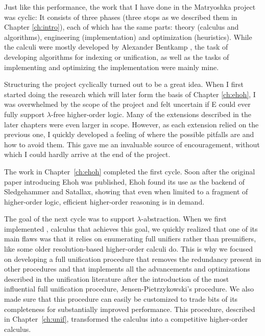 Just like this performance, the work that I have done in the Matryoshka project
was cyclic: It consists of three phases (three stops as we described them in
Chapter \ref{ch:intro}), each of which has the same parts: theory (calculus and
algorithms), engineering (implementation) and optimization (heuristics). While
the calculi were mostly developed by Alexander Bentkamp
\cite{bbcw-21-lfho,bbtvw-21-sup-lam,bbtv-21-full-ho-sup}, the task of developing
algorithms for indexing or unification, as well as the tasks of implementing and
optimizing the implementation were mainly mine.

Structuring the project cyclically turned out to be a great idea. When I first
started doing the research which will later form the basis of Chapter
\ref{ch:ehoh}, I was overwhelmed by the scope of the project and felt uncertain
if E could ever fully support $\lambda$-free higher-order logic. Many of the
extensions described in the  later chapters were even larger in scope. However,
as each extension relied on the previous one, I quickly developed a feeling of
where the possible pitfalls are and how to avoid them. This gave me an invaluable
source of encouragement, without which I could hardly arrive at the end of the
project.

The work in Chapter~\ref{ch:ehoh} completed the first cycle. Soon after the
original paper introducing Ehoh \cite{vbss-19-ehoh1} was published, Ehoh found
its use as the backend of Sledgehammer and Satallax, showing that even when limited
to a fragment of higher-order logic, efficient higher-order reasoning is in
demand.

The goal of the next cycle was to support $\lambda$-abstraction. When we first
implemented \lsup{}, calculus that achieves this goal, we quickly realized that
one of its main flaws was that it relies on enumerating full unifiers rather
than preunifiers, like some older resolution-based higher-order calculi do. This
is why we focused on developing a full unification procedure that removes the
redundancy present in other procedures and that implements all the advancements
and optimizations described in the unification literature after the introduction
of the most influential full unification procedure, Jensen-Pietrzykowski's
procedure. We also made sure that this procedure can easily be customized to
trade bits of its completeness for substantially improved performance. This
procedure, described in Chapter~\ref{ch:unif}, transformed the \lfsup{} calculus
into a competitive higher-order calculus.

